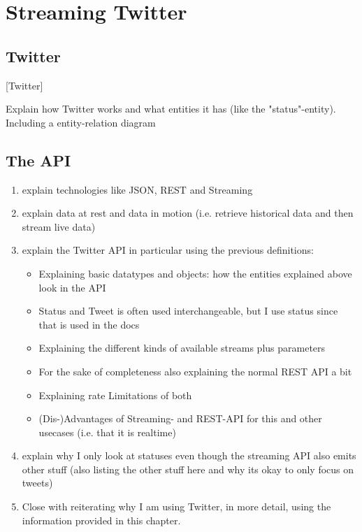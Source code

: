 \chapter{Streaming Twitter}
\label{ch:twitterStreaming}

\section{Twitter}[Twitter]
\label{sec:twitter}

Explain how Twitter works and what entities it has (like the "status"-entity).
Including a entity-relation diagram

\section{The API}
\label{sec:theApi}

\begin{enumerate}
    \item
    explain technologies like JSON, REST and Streaming
    \item
    explain data at rest and data in motion (i.e. retrieve historical data and then stream live data)
    \item
    explain the Twitter API in particular using the previous definitions:
    \begin{itemize}
        \item
        Explaining basic datatypes and objects: how the entities explained above look in the API
        \item
        Status and Tweet is often used interchangeable, but I use status since that is used in the docs
        \item
        Explaining the different kinds of available streams plus parameters
        \item
        For the sake of completeness also explaining the normal REST API a bit
        \item
        Explaining rate Limitations of both
        \item
        (Dis-)Advantages of Streaming- and REST-API for this and other usecases (i.e. that it is realtime)
    \end{itemize}
    \item
    explain why I only look at statuses even though the streaming API also emits other stuff (also listing the other stuff here and why its okay to only focus on tweets)
    \item
    Close with reiterating why I am using Twitter, in more detail, using the information provided in this chapter.
\end{enumerate}

